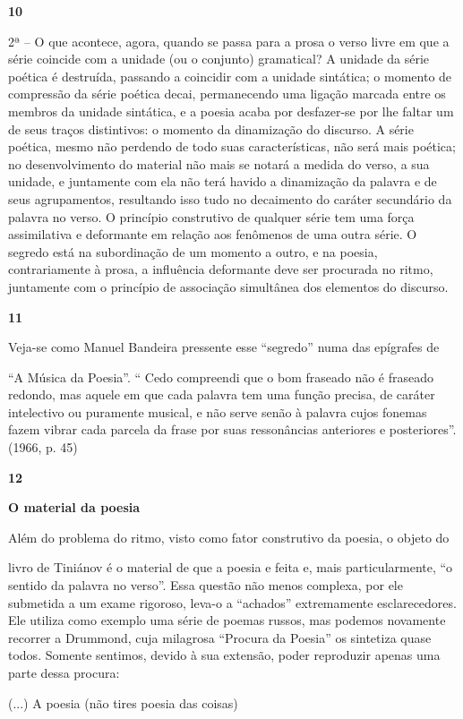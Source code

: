 \textbf{10}

2ª -- O que acontece, agora, quando se passa para a prosa o verso livre
em que a série coincide com a unidade (ou o conjunto) gramatical? A
unidade da série poética é destruída, passando a coincidir com a unidade
sintática; o momento de compressão da série poética decai, permanecendo
uma ligação marcada entre os membros da unidade sintática, e a poesia
acaba por desfazer-se por lhe faltar um de seus traços distintivos: o
momento da dinamização do discurso. A série poética, mesmo não perdendo
de todo suas características, não será mais poética; no desenvolvimento
do material não mais se notará a medida do verso, a sua unidade, e
juntamente com ela não terá havido a dinamização da palavra e de seus
agrupamentos, resultando isso tudo no decaimento do caráter secundário
da palavra no verso. O princípio construtivo de qualquer série tem uma
força assimilativa e deformante em relação aos fenômenos de uma outra
série. O segredo está na subordinação de um momento a outro, e na
poesia, contrariamente à prosa, a influência deformante deve ser
procurada no ritmo, juntamente com o princípio de associação simultânea
dos elementos do discurso.

\textbf{11}

Veja-se como Manuel Bandeira pressente esse ``segredo'' numa das
epígrafes de

``A Música da Poesia''. `` Cedo compreendi que o bom fraseado não é
fraseado redondo, mas aquele em que cada palavra tem uma função precisa,
de caráter intelectivo ou puramente musical, e não serve senão à palavra
cujos fonemas fazem vibrar cada parcela da frase por suas ressonâncias
anteriores e posteriores''. (1966, p. 45)

\textbf{12}

\textbf{O material da poesia}

Além do problema do ritmo, visto como fator construtivo da poesia, o
objeto do

livro de Tiniánov é o material de que a poesia e feita e, mais
particularmente, ``o sentido da palavra no verso''. Essa questão não
menos complexa, por ele submetida a um exame rigoroso, leva-o a
``achados'' extremamente esclarecedores. Ele utiliza como exemplo uma
série de poemas russos, mas podemos novamente recorrer a Drummond, cuja
milagrosa ``Procura da Poesia'' os sintetiza quase todos. Somente
sentimos, devido à sua extensão, poder reproduzir apenas uma parte dessa
procura:

(...) A poesia (não tires poesia das coisas)

